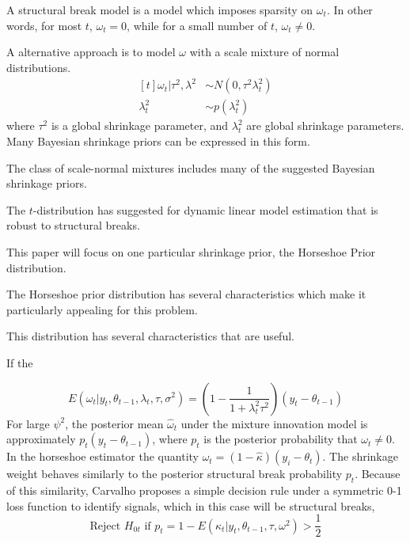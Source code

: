 \documentclass{article}
\begin{document}
A structural break model is a model which imposes sparsity on $\omega_{t}$. 
In other words, for most $t$, $\omega_{t} = 0$, while for a small number of $t$, $\omega_{t} \neq 0$.

A alternative approach is to model $\omega$ with a scale mixture of normal distributions.
\begin{equation}
  \label{eq:6}
  \begin{aligned}[t]
    \omega_{t} | \tau^{2}, \lambda^{2} & \sim N(0, \tau^{2} \lambda_{t}^{2}) \\
    \lambda_{t}^{2} & \sim p(\lambda^{2}_{t})
  \end{aligned}
\end{equation}
where $\tau^{2}$ is a global shrinkage parameter, and $\lambda_{t}^{2}$ are global shrinkage parameters.
Many Bayesian shrinkage priors can be expressed in this form. 

The class of scale-normal mixtures includes many of the suggested Bayesian shrinkage priors.

The $t$-distribution has suggested for dynamic linear model estimation that is robust to structural breaks.

This paper will focus on one particular shrinkage prior, the Horseshoe Prior distribution.

The Horseshoe prior distribution has several characteristics which make it particularly appealing for this problem.

This distribution has several characteristics that are useful.

If the 

\begin{equation}
  \label{eq:10}
  E(\omega_{t} | y_{t}, \theta_{t-1}, \lambda_{t}, \tau, \sigma^{2}) =
  \left(
    1 - \frac{1}{1 + \lambda_{t}^{2} \tau^{2}}
  \right) (y_{t} - \theta_{t - 1})
\end{equation}
For large $\psi^{2}$, the posterior mean $\hat\omega_{t}$ under the mixture innovation model is 
approximately $p_{t} (y_{t} - \theta_{t-1})$, where $p_{t}$ is the posterior probability that $\omega_{t} \neq 0$.
In the horseshoe estimator the quantity $\hat \omega_{t} = (1 - \hat \kappa) (y_{i} - \theta_{t})$.
The shrinkage weight behaves similarly to the posterior structural break probability $p_{t}$.
Because of this similarity, Carvalho proposes a simple decision rule under a symmetric 0-1 loss function
to identify signals, which in this case will be structural breaks,
\begin{equation}
  \label{eq:11}
  \text{Reject $H_{0t}$ if $p_{t} = 1 - E(\kappa_{t} | y_{t}, \theta_{t-1}, \tau, \omega^{2})$} > \frac{1}{2}
\end{equation}
\end{document}
